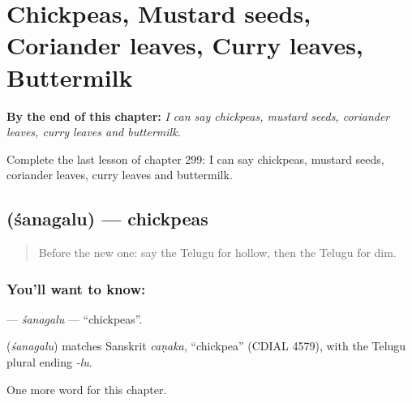 
\chapter{Chickpeas, Mustard seeds, Coriander leaves, Curry leaves, Buttermilk}
\label{ch:te-chickpeas-mustard-seeds-coriander-leaves-curry-leaves-buttermilk}

\begin{chapteropening}
\textbf{By the end of this chapter:} \emph{I can say chickpeas, mustard seeds, coriander leaves, curry leaves and buttermilk.}

Complete the last lesson of chapter 299: I can say chickpeas, mustard seeds, coriander leaves, curry leaves and buttermilk.
\end{chapteropening}

\section[\texorpdfstring{\te{శనగలు} (śanagalu)}{శనగలు (śanagalu)}]{ (śanagalu) — chickpeas}

\label{lesson:TE-C299-sanagalu}



\begin{quote}
Before the new one: say the Telugu for hollow, then the Telugu for dim.
\end{quote}

\subsection*{You'll want to know: }
\textbf{} — \emph{śanagalu} — \textquotedblleft{}chickpeas\textquotedblright{}.

\begin{cousinweb}
\textbf{} (\emph{śanagalu}) matches Sanskrit \emph{caṇaka}, \textquotedblleft{}chickpea\textquotedblright{} (CDIAL 4579), with the Telugu plural ending \emph{-lu}.
\end{cousinweb}

\begin{grammarlens}[title={What you've built}]
One more word for this chapter.
\end{grammarlens}

